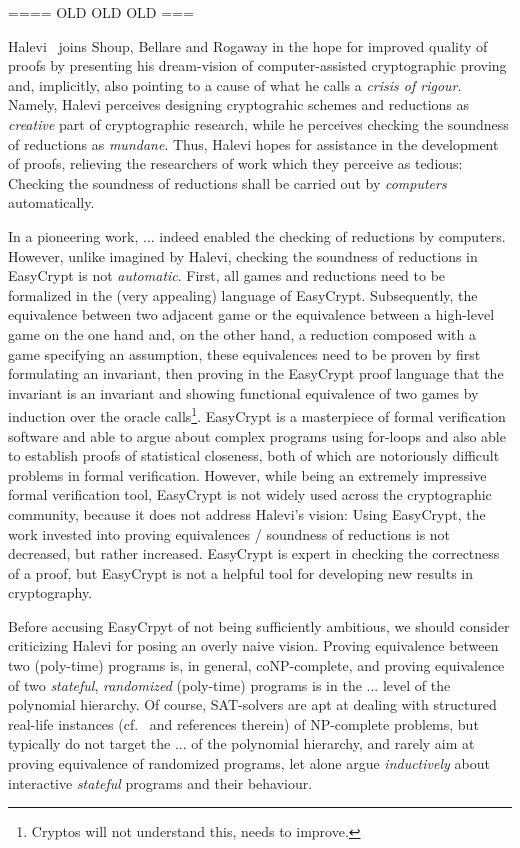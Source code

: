 ==== OLD OLD OLD ===



Halevi~\cite{X} joins Shoup, Bellare and Rogaway in the hope for improved quality of proofs by presenting his dream-vision of computer-assisted cryptographic proving and, implicitly, also pointing to a cause of what he calls a \emph{crisis of rigour}.
Namely, Halevi perceives designing cryptograhic schemes and reductions as \emph{creative} part of cryptographic research, while he perceives checking the soundness
of reductions as \emph{mundane}. Thus, Halevi hopes for assistance in the development
of proofs, relieving the researchers of work which they perceive as tedious: Checking the soundness of reductions shall be carried out by \emph{computers} automatically.

In a pioneering work, ... indeed enabled the checking of reductions by computers. However, unlike imagined by Halevi, checking the soundness of reductions in EasyCrypt is not \emph{automatic}. First, all games and reductions need to be formalized in the (very appealing) language of EasyCrypt. Subsequently, the equivalence between two adjacent game or the equivalence between a high-level game on the one hand and, on the other hand, a reduction composed with a game specifying an assumption, these equivalences need to be proven by first formulating an invariant, then proving in the EasyCrypt proof language that the invariant is an invariant and showing functional equivalence of two games by induction over the oracle calls\footnote{Cryptos will not understand this, needs to improve.}. EasyCrypt is a masterpiece of formal verification software and able to argue about complex programs using for-loops and also able to establish proofs of statistical closeness, both of which are notoriously difficult problems in formal verification. However, while being an extremely impressive formal verification tool, EasyCrypt is not widely used across the cryptographic community, because it does not address Halevi's vision: Using EasyCrypt, the work invested into proving equivalences / soundness of reductions is not decreased, but rather increased. EasyCrypt is expert in checking the correctness of a proof, but EasyCrypt is not a helpful tool for developing new results in cryptography.

Before accusing EasyCrpyt of not being sufficiently ambitious, we should consider criticizing Halevi for posing an overly naive vision. Proving equivalence between two (poly-time) programs is, in general, coNP-complete, and proving equivalence of two \emph{stateful}, \emph{randomized} (poly-time) programs is in the ... level of the polynomial hierarchy. Of course, SAT-solvers are apt at dealing with structured real-life instances (cf.~\cite{X,Y,Z} and references therein) of NP-complete problems, but typically do not target the ... of the polynomial hierarchy, and rarely aim at proving equivalence of randomized programs, let alone argue \emph{inductively} about interactive \emph{stateful} programs and their behaviour.

